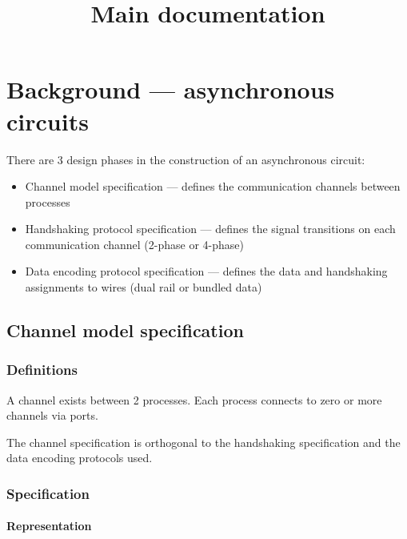 \documentclass{report}
\title{Main documentation}
\begin{document}
\tableofcontents


\chapter{Background --- asynchronous circuits}

There are 3 design phases in the construction of an asynchronous circuit:

\begin{itemize}
    \item Channel model specification --- defines the communication channels
    between processes
    \item Handshaking protocol specification --- defines the signal transitions on
    each communication channel (2-phase or 4-phase)
    \item Data encoding protocol specification --- defines the data and
    handshaking assignments to wires (dual rail or bundled data)
\end{itemize}


\section{Channel model specification}

\subsection{Definitions}

A channel exists between 2 processes. Each process connects to zero or more
channels via ports.

The channel specification is orthogonal to the handshaking specification and
the data encoding protocols used.


\subsection{Specification}

\subsubsection{Representation}
\end{document}
